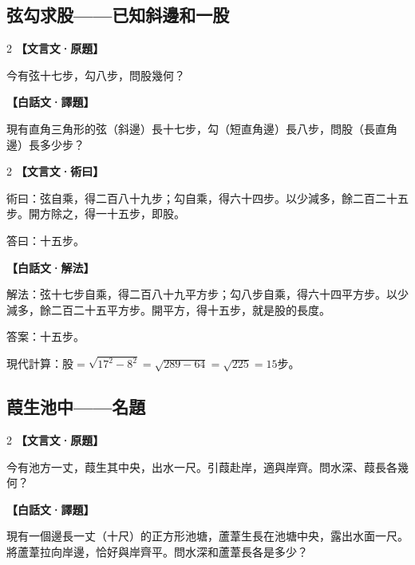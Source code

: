 \documentclass[11pt,a4paper]{article}
\newcommand{\zhc}{}[1]{{\CJKfamily{\CJKrmdefault}#1}}  %
\newcommand{\zhm}[1]{{\CJKfamily{\CJKrmdefault}#1}}  %
\newenvironment{prob bilingual}[1][]{%
  \begin{paracol}{2}%
  \setlength{\columnseprule}{0.4pt}%
}{%
  \end{paracol}%
  \medskip%
}
\begin{document}
\vspace{0.5cm}

\subsection{\zhc{弦勾求股——已知斜邊和一股}}

\begin{paracol}{2}
\switchcolumn[0]
\noindent\textbf{\textcolor{notecolor}{\zhc{【文言文·原題】}}}\par\smallskip
\zhc{
今有弦十七步，勾八步，問股幾何？
}

\switchcolumn[1]
\noindent\textbf{\textcolor{notecolor}{\zhm{【白話文·譯題】}}}\par\smallskip
\zhm{
現有直角三角形的弦（斜邊）長十七步，勾（短直角邊）長八步，問股（長直角邊）長多少步？
}
\end{paracol}

\medskip

\begin{paracol}{2}
\switchcolumn[0]
\noindent\textbf{\textcolor{notecolor}{\zhc{【文言文·術曰】}}}\par\smallskip
\zhc{
術曰：弦自乘，得二百八十九步；勾自乘，得六十四步。以少減多，餘二百二十五步。開方除之，得一十五步，即股。

答曰：十五步。
}

\switchcolumn[1]
\noindent\textbf{\textcolor{notecolor}{\zhm{【白話文·解法】}}}\par\smallskip
\zhm{
解法：弦十七步自乘，得二百八十九平方步；勾八步自乘，得六十四平方步。以少減多，餘二百二十五平方步。開平方，得十五步，就是股的長度。

答案：十五步。

現代計算：$\text{股} = \sqrt{17^2 - 8^2} = \sqrt{289 - 64} = \sqrt{225} = 15$步。
}
\end{paracol}

\vspace{0.5cm}

\subsection{\zhc{葭生池中——名題}}

\begin{paracol}{2}
\switchcolumn[0]
\noindent\textbf{\textcolor{notecolor}{\zhc{【文言文·原題】}}}\par\smallskip
\zhc{
今有池方一丈，葭生其中央，出水一尺。引葭赴岸，適與岸齊。問水深、葭長各幾何？
}

\switchcolumn[1]
\noindent\textbf{\textcolor{notecolor}{\zhm{【白話文·譯題】}}}\par\smallskip
\zhm{
現有一個邊長一丈（十尺）的正方形池塘，蘆葦生長在池塘中央，露出水面一尺。將蘆葦拉向岸邊，恰好與岸齊平。問水深和蘆葦長各是多少？
}
\end{paracol}
\end{document}
